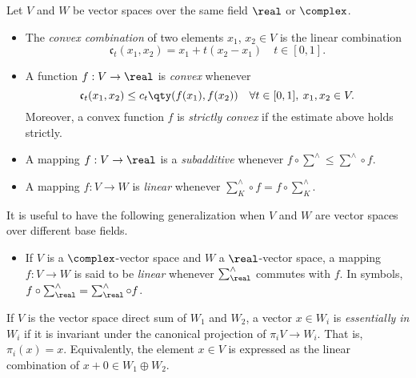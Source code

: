 \documentclass[../main-v2-manifolds.tex]{subfiles}
\begin{document}
    Let $V$ and $W$ be vector spaces over the same field $\real$ or $\complex$.
    \begin{itemize}
    \item The \emph{convex combination} of two elements $x_1$, $x_2\in V$ is the linear combination 
    \[
        \mathfrak{c}_t(x_1, x_2) = x_1 + t(x_2 - x_1) \quad t\in [0,1].
    \]
    \item A function $f: V\to \real$ is \emph{convex} whenever 
    \[
        \mathfrak{c}_t(x_1, x_2)\leq c_t\qty(f(x_1),f(x_2))\quad\forall t\in[0,1],\: x_1,x_2\in V.
    \]
    Moreover, a convex function $f$ is \emph{strictly convex} if the estimate above holds strictly.
    \item A mapping $f: V\to \real$ is a \emph{subadditive} whenever $f\circ\sum^\wedge\leq \sum^\wedge\circ f$.
    \item A mapping $f: V\to W$ is \emph{linear} whenever  $\sum^\wedge_K \circ f = f\circ \sum^\wedge_K$.
\end{itemize}
It is useful to have the following generalization when $V$ and $W$ are vector spaces over different base fields.
\begin{itemize}
\item If $V$ is a $\complex$-vector space and $W$ a $\real$-vector space, a mapping $f: V\to W$ is said to be \emph{linear} whenever $\sum^\wedge_\real$ commutes with $f$. In symbols, $f\circ \sum^\wedge_\real = \sum^\wedge_\real \circ f$.
\end{itemize}
If $V$ is the vector space direct sum of $W_1$ and $W_2$, a vector $x\in W_i$ is \emph{essentially in $W_i$} if it is invariant under the canonical projection of $\pi_i V\to W_i$. That is, $\pi_i (x) = x$. Equivalently, the element $x\in V$ is expressed as the linear combination of $x + 0\in W_1\oplus W_2$.
\end{document}
